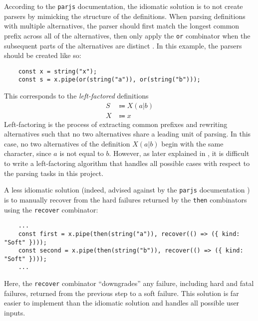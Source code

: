 According to the \lstinline{parjs} documentation, the idiomatic solution is to not create parsers by mimicking the structure of the definitions. When parsing definitions with multiple alternatives, the parser should first match the longest common prefix across all of the alternatives, then only apply the \lstinline{or} combinator when the subsequent parts of the alternatives are distinct \cite{parjs}. In this example, the parsers should be created like so:
\begin{lstlisting}
    const x = string("x");
    const s = x.pipe(or(string("a")), or(string("b")));
\end{lstlisting}
This corresponds to the \textit{left-factored} definitions
\begin{align*}
    S &\Coloneqq X(a|b) \\
    X &\Coloneqq x
\end{align*}
Left-factoring is the process of extracting common prefixes and rewriting alternatives such that no two alternatives share a leading unit of parsing. In this case, no two alternatives of the definition $X(a|b)$ begin with the same character, since $a$ is not equal to $b$. However, as later explained in , it is difficult to write a left-factoring algorithm that handles all possible cases with respect to the parsing tasks in this project.

A less idiomatic solution (indeed, advised against by the \lstinline{parjs} documentation \cite{parjs}) is to manually recover from the hard failures returned by the \lstinline{then} combinators using the \lstinline{recover} combinator:
\begin{lstlisting}
    ...
    const first = x.pipe(then(string("a")), recover(() => ({ kind: "Soft" })));
    const second = x.pipe(then(string("b")), recover(() => ({ kind: "Soft" })));
    ...
\end{lstlisting}
Here, the \lstinline{recover} combinator ``downgrades'' any failure, including hard and fatal failures, returned from the previous step to a soft failure. This solution is far easier to implement than the idiomatic solution and handles all possible user inputs.
